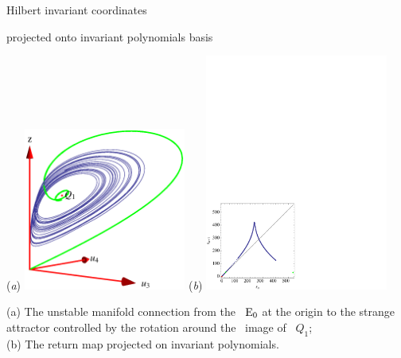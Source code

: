 \documentclass{beamer}
\begin{document}
\begin{frame}{Hilbert invariant coordinates}
\begin{block}{projected onto in\-vari\-ant polynomials basis}
\begin{center}
(\textit{a})
  \includegraphics[width=0.40\textwidth,clip=true]
  {../../figs/CLEip1}
(\textit{b})
  \includegraphics[width=0.45\textwidth,clip=true]
  {../../figs/CLEipRM}
\end{center}
\end{block}
(a) The unstable manifold connection from the \eqv\ $\mathrm{E}_{0}$ at
the origin to the strange attractor controlled by the
rotation around the \reducedsp\ image of \reqv\ $Q_{1}$;
\\
(b) The return map  projected on in\-vari\-ant polynomials.
\end{frame}
\end{document}
